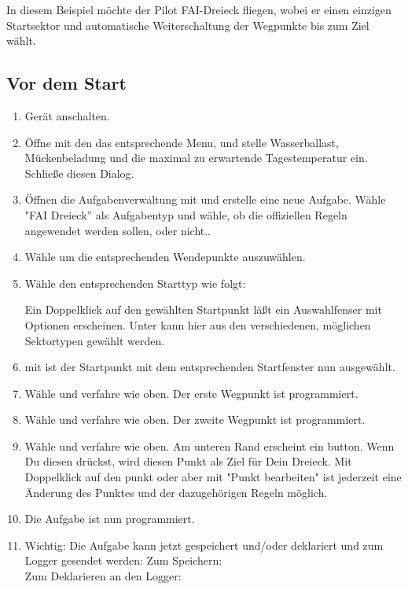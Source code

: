 In diesem Beispiel möchte der Pilot FAI-Dreieck fliegen, wobei er einen einzigen
Startsektor und automatische Weiterschaltung der Wegpunkte bis zum Ziel wählt.

\subsection*{Vor dem Start}
\begin{enumerate}
\item  Gerät anschalten.
\item  Öffne mit den   das entsprechende Menu,
und stelle Wasserballast, Mückenbeladung und die maximal zu erwartende  Tagestemperatur ein. Schließe diesen Dialog.
\item  Öffnen die Aufgabenverwaltung  mit 
 und erstelle eine neue  Aufgabe. Wähle  "FAI Dreieck'' als Aufgabentyp und wähle,
ob die offiziellen Regeln angewendet werden sollen, oder nicht..
\item  Wähle  um die entsprechenden Wendepunkte auszuwählen.
\item Wähle den entsprechenden Starttyp wie folgt:

Ein Doppelklick auf den gewählten Startpunkt  läßt ein Auswahlfenser mit Optionen erscheinen. Unter  kann
hier aus den verschiedenen, möglichen  Sektortypen gewählt werden.
\item mit  ist der Startpunkt mit dem entsprechenden Startfenster nun ausgewählt.
\item  Wähle  und verfahre wie oben. Der erste Wegpunkt ist programmiert.
\item  Wähle  und verfahre wie oben. Der zweite Wegpunkt ist programmiert.
\item  Wähle  und verfahre wie oben. Am unteren Rand erscheint ein button.
Wenn Du diesen drückst, wird \xc diesen Punkt als Ziel für Dein Dreieck. Mit Doppelklick auf den punkt oder aber mit "Punkt bearbeiten" ist jederzeit eine
Änderung des Punktes und der dazugehörigen Regeln möglich.
\item  Die Aufgabe ist nun programmiert.
\item Wichtig:
Die Aufgabe kann jetzt gespeichert und/oder deklariert und zum Logger gesendet werden:
Zum Speichern:  \\
Zum Deklarieren an den Logger: 
\end{enumerate}

